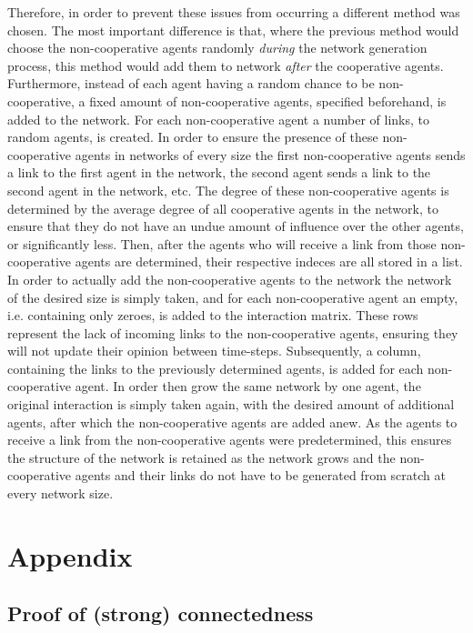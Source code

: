 \documentclass{article}
\begin{document}
Therefore, in order to prevent these issues from occurring a different method was chosen. The most important difference is that, where the previous method would choose the non-cooperative agents randomly \textit{during} the network generation process, this method would add them to network \textit{after} the cooperative agents. Furthermore, instead of each agent having a random chance to be non-cooperative, a fixed amount of non-cooperative agents, specified beforehand, is added to the network. For each non-cooperative agent a number of links, to random agents, is created. In order to ensure the presence of these non-cooperative agents in networks of every size the first non-cooperative agents sends a link to the first agent in the network, the second agent sends a link to the second agent in the network, etc. The degree of these non-cooperative agents is determined by the average degree of all cooperative agents in the network, to ensure that they do not have an undue amount of influence over the other agents, or significantly less. Then, after the agents who will receive a link from those non-cooperative agents are determined, their respective indeces are all stored in a list. In order to actually add the non-cooperative agents to the network the network of the desired size is simply taken, and for each non-cooperative agent an empty, i.e. containing only zeroes, is added to the interaction matrix. These rows represent the lack of incoming links to the non-cooperative agents, ensuring they will not update their opinion between time-steps. Subsequently, a column, containing the links to the previously determined agents, is added for each non-cooperative agent. In order then grow the same network by one agent, the original interaction is simply taken again, with the desired amount of additional agents, after which the non-cooperative agents are added anew. As the agents to receive a link from the non-cooperative agents were predetermined, this ensures the structure of the network is retained as the network grows and the non-cooperative agents and their links do not have to be generated from scratch at every network size.

\newpage
\section{Appendix}
\subsection{Proof of (strong) connectedness}
\end{document}
